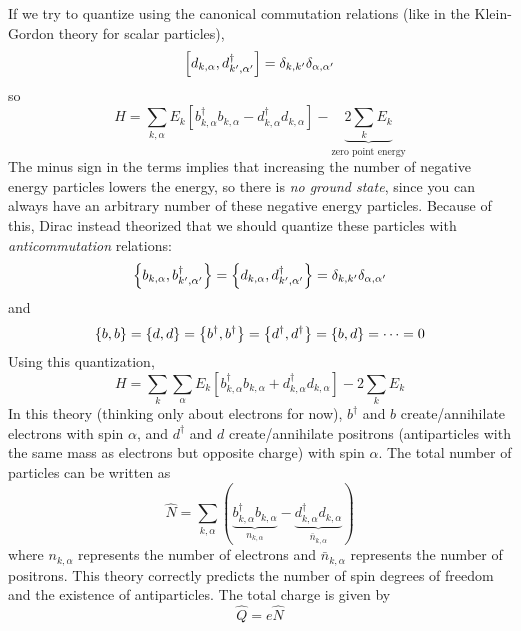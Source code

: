 \documentclass[a4paper,twoside,master.tex]{subfiles}
\begin{document}
If we try to quantize using the canonical commutation relations (like in the Klein-Gordon theory for scalar particles),
\begin{equation}
    \comm{d_{k, \alpha}}{d^\dagger_{k', \alpha'}} = \delta_{k, k'} \delta_{\alpha, \alpha'}
\end{equation}
so
\begin{equation}
    H = \sum_{k, \alpha} E_k \left[ b^\dagger_{k, \alpha} b_{k, \alpha} - d^\dagger_{k, \alpha} d_{k, \alpha} \right] - \underbrace{2 \sum_k E_k}_{\text{zero point energy}}
\end{equation}
The minus sign in the terms implies that increasing the number of negative energy particles lowers the energy, so there is \textit{no ground state}, since you can always have an arbitrary number of these negative energy particles. Because of this, Dirac instead theorized that we should quantize these particles with \textit{anticommutation} relations:
\begin{equation}
    \pb{b_{k, \alpha}}{b^\dagger_{k', \alpha'}} = \pb{d_{k, \alpha}}{d^\dagger_{k', \alpha'}} = \delta_{k,k'} \delta_{\alpha, \alpha'}
\end{equation}
and
\begin{equation}
    \pb{b}{b} = \pb{d}{d} = \pb{b^\dagger}{b^\dagger} = \pb{d^\dagger}{d^\dagger} = \pb{b}{d} = \cdots = 0
\end{equation}
Using this quantization,
\begin{equation}
    H = \sum_{k} \sum_{\alpha} E_k \left[ b^\dagger_{k, \alpha} b_{k, \alpha} + d^\dagger_{k, \alpha} d_{k, \alpha}  \right] - 2 \sum_k E_k
\end{equation}
In this theory (thinking only about electrons for now), $ b^\dagger $ and $ b $ create/annihilate electrons with spin $ \alpha $, and $ d^\dagger $ and $ d $ create/annihilate positrons (antiparticles with the same mass as electrons but opposite charge) with spin $ \alpha $. The total number of particles can be written as
\begin{equation}
    \hat{N} = \sum_{k, \alpha} \left( \underbrace{b^\dagger_{k, \alpha} b_{k, \alpha}}_{n_{k, \alpha}} - \underbrace{d^\dagger_{k, \alpha} d_{k, \alpha}}_{\bar{n}_{k, \alpha}} \right)
\end{equation}
where $ n_{k, \alpha} $ represents the number of electrons and $ \bar{n}_{k, \alpha} $ represents the number of positrons. This theory correctly predicts the number of spin degrees of freedom and the existence of antiparticles. The total charge is given by
\begin{equation}
    \hat{Q} = e \hat{N}
\end{equation}
\end{document}

